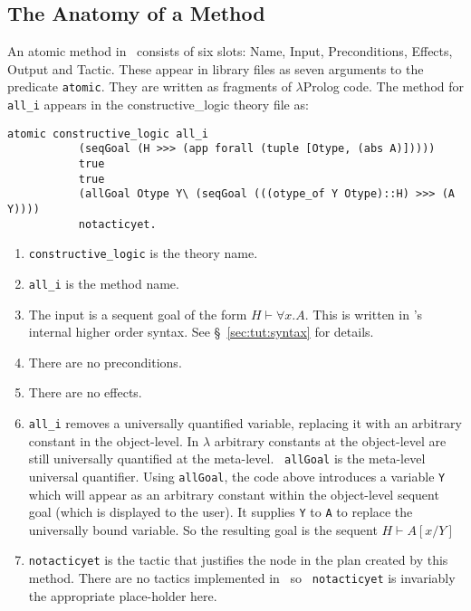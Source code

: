 \subsection{The Anatomy of a Method}
An atomic method in \lclam\ consists of six slots:  Name,
Input, Preconditions,
Effects,   
Output and Tactic.  
These appear in library files as seven arguments 
to the predicate {\tt atomic}.  They are written
as fragments of 
$\lambda$Prolog code.  The method for {\tt all\_i} appears in the constructive\_logic theory
file as:
\begin{verbatim}
atomic constructive_logic all_i 
           (seqGoal (H >>> (app forall (tuple [Otype, (abs A)])))) 
           true
           true 
           (allGoal Otype Y\ (seqGoal (((otype_of Y Otype)::H) >>> (A Y)))) 
           notacticyet.
\end{verbatim}
\begin{enumerate}
\item {\tt constructive\_logic} is the theory name.
\item {\tt all\_i} is the method name.  
\item The input is a
sequent goal of the form $H \vdash \forall x. A$.
This is written in 
\lclam's internal higher order syntax.
See \S~\ref{sec:tut:syntax} for details.
\item There are no preconditions.
\item There are no effects.  
\item {\tt all\_i} removes a universally quantified
  variable, replacing it with an arbitrary constant
  in the object-level.  In $\lambda${\clam}
  arbitrary constants at the object-level are still universally
  quantified at the meta-level.  {\tt
    allGoal} is the meta-level universal quantifier.
  Using {\tt allGoal}, the code above introduces a variable {\tt Y}
  which will appear as an arbitrary constant within the object-level
  sequent goal (which is displayed to the user).  It supplies {\tt Y}
  to {\tt A} to replace the universally bound variable.  So the
  resulting goal is the sequent $H \vdash A[x/Y]$
\item {\tt notacticyet} is the
  tactic that justifies 
the node in the 
plan created by 
this method.  There are no tactics implemented in \lclam\ so {\tt
  notacticyet} is invariably the appropriate place-holder here.
\end{enumerate}


